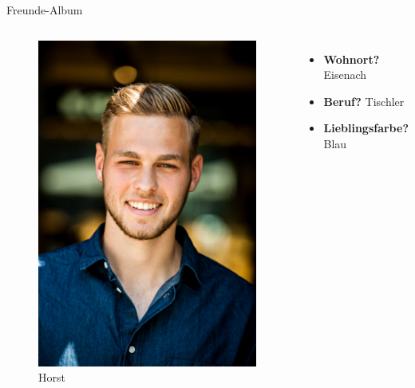 \documentclass[aspectratio=169,compress]{beamer}
\begin{document}
\begin{frame}{Freunde-Album}
	\begin{columns}[c]
		\begin{figure}
			\includegraphics[scale=.15]{horst_steckbrief}
			\caption{Horst}
		\end{figure}
		 \pause
		\begin{itemize}
			\item \textbf{Wohnort?} \pause Eisenach
			\item \textbf{Beruf?} \pause Tischler
			\item \textbf{Lieblingsfarbe?} \pause Blau
		\end{itemize}
	\end{columns}
\end{frame}
\end{document}
